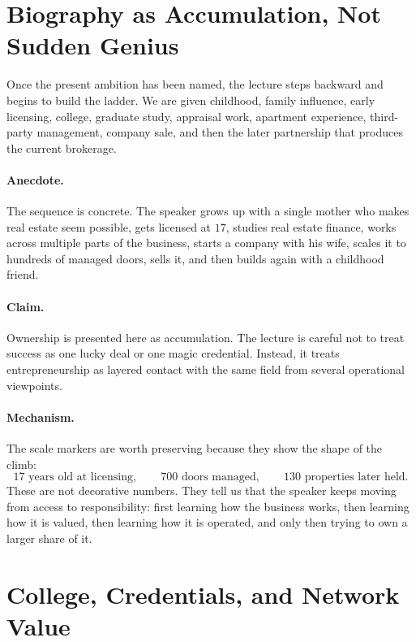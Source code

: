 \section{Biography as Accumulation, Not Sudden Genius}

Once the present ambition has been named, the lecture steps backward and begins to build the ladder. We are given childhood, family influence, early licensing, college, graduate study, appraisal work, apartment experience, third-party management, company sale, and then the later partnership that produces the current brokerage.

\paragraph{Anecdote.}
The sequence is concrete. The speaker grows up with a single mother who makes real estate seem possible, gets licensed at \(17\), studies real estate finance, works across multiple parts of the business, starts a company with his wife, scales it to hundreds of managed doors, sells it, and then builds again with a childhood friend.

\paragraph{Claim.}
Ownership is presented here as accumulation. The lecture is careful not to treat success as one lucky deal or one magic credential. Instead, it treats entrepreneurship as layered contact with the same field from several operational viewpoints.

\paragraph{Mechanism.}
The scale markers are worth preserving because they show the shape of the climb:
\begin{equation}
17 \text{ years old at licensing}, \qquad
700 \text{ doors managed}, \qquad
130 \text{ properties later held}.
\end{equation}
These are not decorative numbers. They tell us that the speaker keeps moving from access to responsibility: first learning how the business works, then learning how it is valued, then learning how it is operated, and only then trying to own a larger share of it.

\section{College, Credentials, and Network Value}

